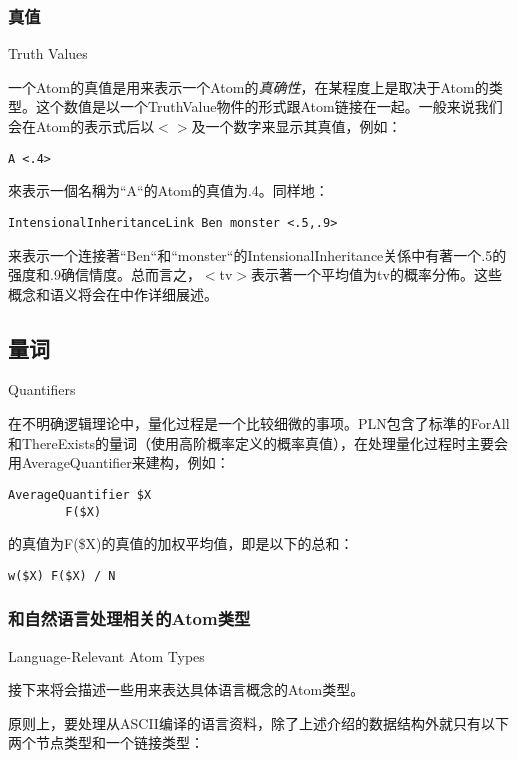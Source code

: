 \subsubsection{真值}{Truth Values}
\label{真值}

一个Atom的真值是用来表示一个Atom的\textit{真确性}，在某程度上是取决于Atom的类型。这个数值是以一个TruthValue物件的形式跟Atom链接在一起。一般来说我们会在Atom的表示式后以\ensuremath{<}\ensuremath{>}及一个数字来显示其真值，例如：

\begin{verbatim}
A <.4>
\end{verbatim}

來表示一個名稱为“A“的Atom的真值为.4。同样地：

\begin{verbatim}
IntensionalInheritanceLink Ben monster <.5,.9>
\end{verbatim}

\noindent 来表示一个连接著“Ben“和“monster“的IntensionalInheritance关係中有著一个.5的强度和.9确信情度。总而言之，\ensuremath{<}tv\ensuremath{>}表示著一个平均值为tv的概率分佈。这些概念和语义将会在\cite{PLN}中作详细展述。

\subsection{量词}{Quantiﬁers}  

在不明确逻辑理论中，量化过程是一个比较细微的事项。PLN包含了标準的ForAll和ThereExists的量词（使用高阶概率定义的概率真值），在处理量化过程时主要会用AverageQuantifier来建构，例如：

\begin{verbatim}
AverageQuantifier $X
        F($X)
\end{verbatim}

的真值为F(\$X)的真值的加权平均值，即是以下的总和：

\begin{verbatim}
w($X) F($X) / N
\end{verbatim}

\subsubsection{和自然语言处理相关的Atom类型}{Language-Relevant Atom Types}

接下来将会描述一些用来表达具体语言概念的Atom类型。

原则上，要处理从ASCII编译的语言资料，除了上述介绍的数据结构外就只有以下两个节点类型和一个链接类型：

